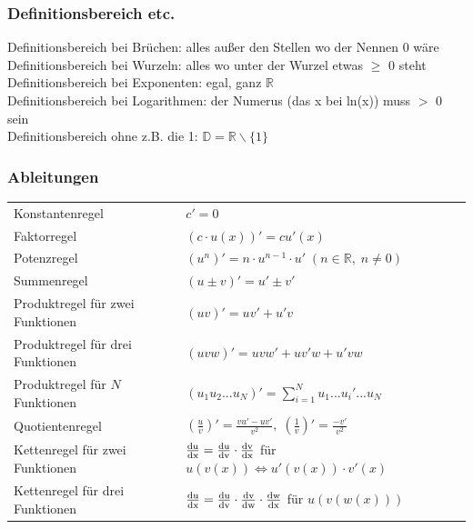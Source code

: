 \documentclass[6pt,a4paper]{scrartcl}
\begin{document}
\begin{multicols*}{2}
\subsubsection{Definitionsbereich etc.}
Definitionsbereich bei Brüchen: alles außer den Stellen wo der Nennen 0 wäre \\
Definitionsbereich bei Wurzeln: alles wo unter der Wurzel etwas $\geq$ 0 steht \\
Definitionsbereich bei Exponenten: egal, ganz $\mathbb{R}$ \\
Definitionsbereich bei Logarithmen: der Numerus (das x bei ln(x)) muss $>$ 0 sein \\
Definitionsbereich ohne z.B. die 1: $\mathbb{D} = \mathbb{R} \backslash \{1\}$ \\

\subsubsection{Ableitungen}
\begin{tabular}{ll}
Konstantenregel						& $ c'=0 $																								\\
Faktorregel							& $ (c \cdot u(x))' = c u'(x) $																			\\
Potenzregel							& $ \left(u^n\right)' = n \cdot u^{n-1} \cdot u'\; (n \in \mathbb R, \; n \neq 0) $						\\
Summenregel							& $ (u\pm v)' = u'\pm v' $																				\\
Produktregel für zwei Funktionen		& $ (uv)' = uv'+u'v $																					\\
Produktregel für drei Funktionen		& $ (uvw)' = uvw' + uv'w + u'vw $																		\\
Produktregel für $ N $ Funktionen	& $ (u_1u_2...u_N)' = \sum_{i=1}^Nu_1...u_i'...u_N $														\\
Quotientenregel						& $ \left(\frac{u}{v}\right)' = \frac{vu'-uv'}{v^2}, \; \left( \frac{1}{v}\right)' = \frac{-v'}{v^2} $		\\
Kettenregel für zwei Funktionen		& $ \frac{\rm d u}{\rm d x} = \frac{\rm d u}{\rm d v}\cdot \frac{\rm d v}{\rm d x} $ für $ u(v(x)) \Leftrightarrow u'(v(x)) \cdot v'(x)$		\\
Kettenregel für drei Funktionen		& $ \frac{\rm d u }{\rm d x} = \frac{\rm d u}{\rm d v}\cdot \frac{\rm d v}{\rm d w}\cdot \frac{\rm d w}{\rm d x} $ für $ u(v(w(x))) $ \\
\end{tabular}\\

\end{multicols*}
\end{document}

